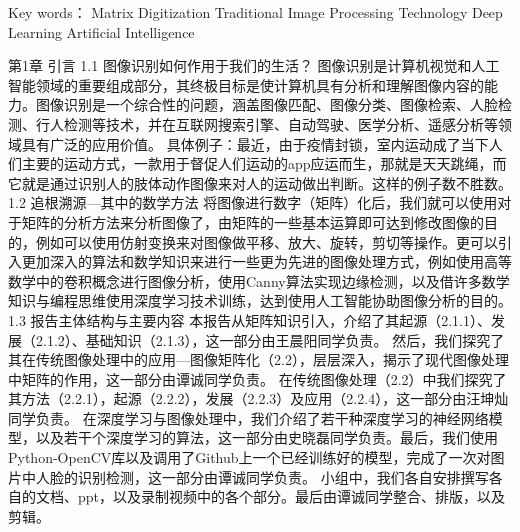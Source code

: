 Key words： Matrix    Digitization    Traditional Image Processing Technology 
Deep Learning    Artificial Intelligence














第1章  引言
1.1 图像识别如何作用于我们的生活？
	图像识别是计算机视觉和人工智能领域的重要组成部分，其终极目标是使计算机具有分析和理解图像内容的能力。图像识别是一个综合性的问题，涵盖图像匹配、图像分类、图像检索、人脸检测、行人检测等技术，并在互联网搜索引擎、自动驾驶、医学分析、遥感分析等领域具有广泛的应用价值。
具体例子：最近，由于疫情封锁，室内运动成了当下人们主要的运动方式，一款用于督促人们运动的app应运而生，那就是天天跳绳，而它就是通过识别人的肢体动作图像来对人的运动做出判断。这样的例子数不胜数。
1.2 追根溯源---其中的数学方法
	将图像进行数字（矩阵）化后，我们就可以使用对于矩阵的分析方法来分析图像了，由矩阵的一些基本运算即可达到修改图像的目的，例如可以使用仿射变换来对图像做平移、放大、旋转，剪切等操作。更可以引入更加深入的算法和数学知识来进行一些更为先进的图像处理方式，例如使用高等数学中的卷积概念进行图像分析，使用Canny算法实现边缘检测，以及借许多数学知识与编程思维使用深度学习技术训练，达到使用人工智能协助图像分析的目的。
1.3 报告主体结构与主要内容
	本报告从矩阵知识引入，介绍了其起源（2.1.1）、发展（2.1.2）、基础知识（2.1.3），这一部分由王晨阳同学负责。
然后，我们探究了其在传统图像处理中的应用---图像矩阵化（2.2），层层深入，揭示了现代图像处理中矩阵的作用，这一部分由谭诚同学负责。
在传统图像处理（2.2）中我们探究了其方法（2.2.1），起源（2.2.2），发展（2.2.3）及应用（2.2.4），这一部分由汪坤灿同学负责。
在深度学习与图像处理中，我们介绍了若干种深度学习的神经网络模型，以及若干个深度学习的算法，这一部分由史晓磊同学负责。最后，我们使用Python-OpenCV库以及调用了Github上一个已经训练好的模型，完成了一次对图片中人脸的识别检测，这一部分由谭诚同学负责。
小组中，我们各自安排撰写各自的文档、ppt，以及录制视频中的各个部分。最后由谭诚同学整合、排版，以及剪辑。
	 
